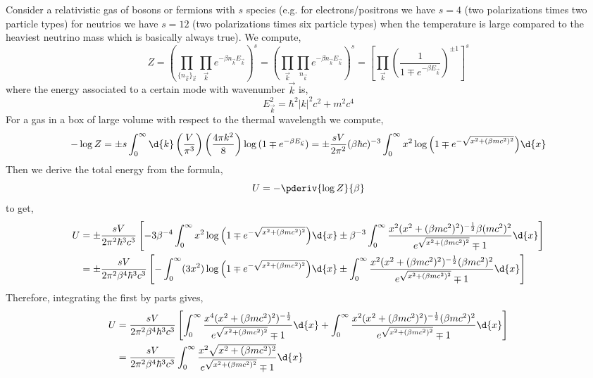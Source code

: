 \documentclass[12pt]{article}
\begin{document}
Consider a relativistic gas of bosons or fermions with $s$ species (e.g. for electrons/positrons we have $s = 4$ (two polarizations times two particle types) for neutrios we have $s = 12$ (two polarizations times six particle types)  when the temperature is large compared to the heaviest neutrino mass which is basically always true). We compute,
\[ Z = \left( \prod_{ \{ n_{\vec{k}} \}_{\vec{k}}} \prod_{\vec{k}} e^{- \beta n_{\vec{k}} E_{\vec{k}}} \right)^s = \left( \prod_{\vec{k}} \prod_{n_{\vec{k}}} e^{-\beta n_{\vec{k}} E_{\vec{k}}} \right)^s = \left[ \prod_{\vec{k}} \left( \frac{1}{1 \mp e^{-\beta E_{\vec{k}}}} \right)^{\pm 1} \right]^s \]
where the energy associated to a certain mode with wavenumber $\vec{k}$ is,
\[ E_{\vec{k}}^2 = \hbar^2 |k|^2 c^2 + m^2 c^4 \]
For a gas in a box of large volume with respect to the thermal wavelength we compute,
\[ -\log{Z} = \pm s \int_0^{\infty} \d{k} \left( \frac{V}{\pi^3} \right) \left( \frac{4 \pi k^2}{8} \right) \log{(1 \mp e^{-\beta E_{\vec{k}}})} = \pm \frac{s V}{2 \pi^2} (\beta \hbar c)^{-3} \int_0^{\infty} x^2 \log{\left(1 \mp e^{-\sqrt{x^2 + (\beta m c^2)^2}}\right)} \d{x} \] 
Then we derive the total energy from the formula,
\[ U = - \pderiv{\log{Z}}{\beta} \] 
to get,
\begin{align*}
U &= \pm \frac{s V}{2 \pi^2 \hbar^3 c^3} \left[ - 3 \beta^{-4} \int_0^{\infty} x^2 \log{\left(1 \mp e^{-\sqrt{x^2 + (\beta m c^2)^2}}\right)} \d{x}  \pm \beta^{-3} \int_0^{\infty} \frac{x^2 (x^2 + (\beta m c^2)^2)^{-\frac{1}{2}} \beta (m c^2)^2}{e^{\sqrt{x^2 + (\beta m c^2)^2}} \mp 1} \d{x} \right] 
\\
& = \pm \frac{s V}{2 \pi^2 \beta^4 \hbar^3 c^3} \left[ - \int_0^{\infty} (3 x^2) \log{\left(1 \mp e^{-\sqrt{x^2 + (\beta m c^2)^2}}\right)} \d{x}  \pm \int_0^{\infty} \frac{x^2 (x^2 + (\beta m c^2)^2)^{-\frac{1}{2}} (\beta m c^2)^2}{e^{\sqrt{x^2 + (\beta m c^2)^2}} \mp 1} \d{x} \right] 
\end{align*}
Therefore, integrating the first by parts gives,
\begin{align*}
U & = \frac{s V}{2 \pi^2 \beta^4 \hbar^3 c^3} \left[ \int_0^{\infty} \frac{x^4 (x^2 + (\beta m c^2)^2)^{-\frac{1}{2}}}{e^{\sqrt{x^2 + (\beta m c^2)^2}} \mp 1} \d{x} + \int_0^{\infty} \frac{x^2 (x^2 + (\beta m c^2)^2)^{-\frac{1}{2}} (\beta m c^2)^2}{e^{\sqrt{x^2 + (\beta m c^2)^2}} \mp 1} \d{x} \right] 
\\
& = \frac{s V}{2 \pi^2 \beta^4 \hbar^3 c^3} \int_0^{\infty} \frac{x^2 \sqrt{x^2 + (\beta m c^2)^2}}{e^{\sqrt{x^2 + (\beta m c^2)^2}} \mp 1} \d{x}
\end{align*}
\end{document}
